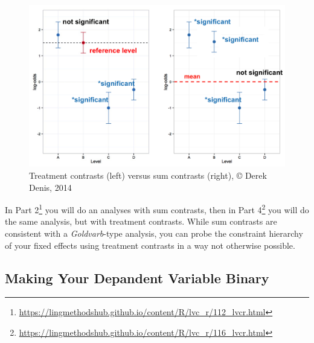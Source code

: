 \documentclass[
  10pt,
  letterpaper]{article}
\DeclareRobustCommand{\href}[2]{#2\footnote{\url{#1}}}
\begin{document}
\begin{figure}

{\centering \includegraphics{images/treatmentsum.png}

}

\caption{\label{fig-contrasts}Treatment contrasts (left) versus sum
contrasts (right), ©️ Derek Denis, 2014}

\end{figure}

In
\href{https://lingmethodshub.github.io/content/R/lvc_r/112_lvcr.html}{Part
2} you will do an analyses with sum contrasts, then in
\href{https://lingmethodshub.github.io/content/R/lvc_r/116_lvcr.html}{Part
4} you will do the same analysis, but with treatment contrasts. While
sum contrasts are consistent with a \emph{Goldvarb}-type analysis, you
can probe the constraint hierarchy of your fixed effects using treatment
contrasts in a way not otherwise possible.

\hypertarget{making-your-depandent-variable-binary}{%
\subsection{Making Your Depandent Variable
Binary}\label{making-your-depandent-variable-binary}}
\end{document}
